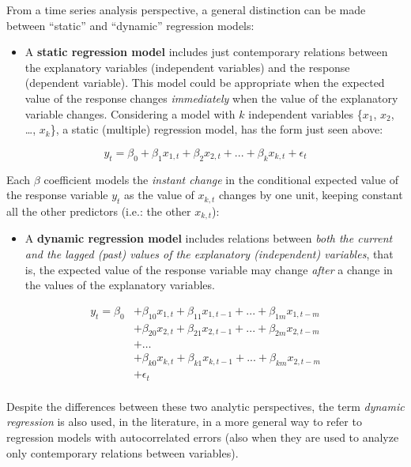 \documentclass[
]{article}
\providecommand{\tightlist}{%
  \setlength{\itemsep}{0pt}\setlength{\parskip}{0pt}}
\begin{document}
From a time series analysis perspective, a general distinction can be made between ``static'' and ``dynamic'' regression models:

\begin{itemize}
\tightlist
\item
  A \textbf{static regression model} includes just contemporary relations between the explanatory variables (independent variables) and the response (dependent variable). This model could be appropriate when the expected value of the response changes \emph{immediately} when the value of the explanatory variable changes. Considering a model with \(k\) independent variables \{\(x_1\), \(x_2\), \ldots, \(x_k\)\}, a static (multiple) regression model, has the form just seen above:
\end{itemize}

\[
y_t = \beta_0 + \beta_1x_{1,t} + \beta_2x_{2,t} + ... + \beta_kx_{k,t} + \epsilon_t
\]

Each \(\beta\) coefficient models the \emph{instant change} in the conditional expected value of the response variable \(y_t\) as the value of \(x_{k,t}\) changes by one unit, keeping constant all the other predictors (i.e.: the other \(x_{k,t}\)):

\begin{itemize}
\tightlist
\item
  A \textbf{dynamic regression model} includes relations between \emph{both the current and the lagged (past) values of the explanatory (independent) variables}, that is, the expected value of the response variable may change \emph{after} a change in the values of the explanatory variables.
\end{itemize}

\[
\begin{aligned} 
y_t = \beta_0  & + \beta_{10}x_{1,t} + \beta_{11}x_{1,t-1} + ... + \beta_{1m}x_{1,t-m} \\
& + \beta_{20}x_{2,t} + \beta_{21}x_{2,t-1} + ... + \beta_{2m}x_{2,t-m} \\
& + \dots \\
& + \beta_{k0}x_{k,t} + \beta_{k1}x_{k,t-1} + ... + \beta_{km}x_{2,t-m} \\
& + \epsilon_t \\
\end{aligned} 
\]

Despite the differences between these two analytic perspectives, the term \emph{dynamic regression} is also used, in the literature, in a more general way to refer to regression models with autocorrelated errors (also when they are used to analyze only contemporary relations between variables).
\end{document}
